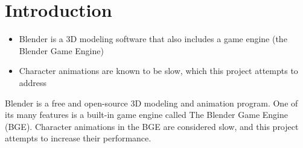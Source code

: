 \section{Introduction}
\ifsummaries
\begin{itemize}
 \item Blender is a 3D modeling software that also includes a game engine (the Blender Game Engine)
 \item Character animations are known to be slow, which this project attempts to address
\end{itemize}
\fi

Blender is a free and open-source 3D modeling and animation program\cite{blender}.
One of its many features is a built-in game engine called The Blender Game Engine (BGE).
Character animations in the BGE are considered slow, and this project attempts to increase their performance.


